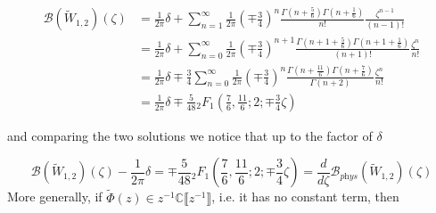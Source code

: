 \documentclass{article}
\newcommand{\C}{\mathbb{C}}
\newcommand{\borel}{\mathcal{B}}
\theoremstyle{definition}
\theoremstyle{plain}
\begin{document}
\begin{align*}
\borel(\tilde{W}_{1,2})(\zeta)&=\frac{1}{2\pi}\delta+\sum_{n=1}^{\infty} \frac{1}{2\pi}\left(\mp\frac{3}{4}\right)^{n}\frac{\Gamma(n+\frac{5}{6})\Gamma(n+\frac{1}{6})}{n!}\frac{\zeta^{n-1}}{(n-1)!}\\
&=\frac{1}{2\pi}\delta+\sum_{n=0}^{\infty} \frac{1}{2\pi}\left(\mp\frac{3}{4}\right)^{n+1}\frac{\Gamma(n+1+\frac{5}{6})\Gamma(n+1+\frac{1}{6})}{(n+1)!}\frac{\zeta^{n}}{n!}\\
&=\frac{1}{2\pi}\delta\mp\frac{3}{4}\sum_{n=0}^{\infty} \frac{1}{2\pi}\left(\mp\frac{3}{4}\right)^{n}\frac{\Gamma(n+\frac{11}{6})\Gamma(n+\frac{7}{6})}{\Gamma(n+2)}\frac{\zeta^{n}}{n!}\\
&=\frac{1}{2\pi}\delta\mp\frac{5}{48} {}_2F_1\left(\frac{7}{6},\frac{11}{6};2;\mp\frac{3}{4}\zeta\right)%
\end{align*}

and comparing the two solutions we notice that up to the factor of $\delta$

\begin{equation}\label{Borel-W12}
\borel(\tilde{W}_{1,2})(\zeta)-\frac{1}{2\pi}\delta=\mp \frac{5}{48} {}_2F_1\left(\frac{7}{6},\frac{11}{6};2;\mp\frac{3}{4}\zeta\right)=\frac{d}{d\zeta}\borel_{\textit{phys}}(\tilde{W}_{1,2})(\zeta) 
\end{equation}
More generally, if $\tilde{\Phi}(z)\in z^{-1}\C \llbracket z^{-1} \rrbracket$, i.e. it has no constant term, then 
\end{document}
